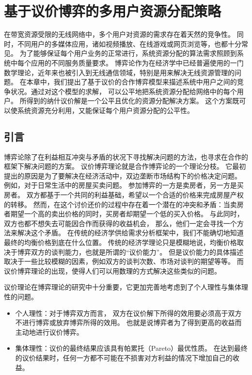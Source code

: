 \graphicspath{ {../body/nash_bargaining_figures/} }
\chapter{基于议价博弈的多用户资源分配策略}
在带宽资源受限的无线网络中，多个用户对资源的需求存在着天然的竞争性。
同时，不同用户的多媒体应用，诸如视频播放、在线游戏或网页浏览等，也都十分常见。
为了能够保证每个用户业务的正常进行，系统资源分配的算法需求照顾到系统中每个应用的不同服务质量要求。
博弈论作为在经济学中已经普遍使用的一门数学理论，近年来也被引入到无线通信领域，特别是用来解决无线资源管理的问题。
在本章中，我们提出了基于议价的合作博弈模型来描述系统中用户之间的竞争状况。通过对这个模型的求解，
可以公平地把系统资源分配给网络中的每个用户。
所得到的纳什议价解是一个公平且优化的资源分配解决方案。
这个方案既可以使系统资源充分利用，又能保证每个用户资源分配的公平性。

\section{引言}
博弈论除了在利益相互冲突与矛盾的状况下寻找解决问题的方法，也寻求在合作的框架下解决问题的方案。
议价博弈理论就是合作博弈论的一个理论分枝。
它最初提出的原因是为了要解决在经济活动中，双边垄断市场结构下的价格决定问题。
例如，对于日常生活中的房屋买卖问题。
参加博弈的一方是卖房者，另一方是买房者。
双方都基于一个共同的利益基础，希望以一个合适的价格来完成房屋产权的转移。
然而，在这个讨价还价的过程中存在着一个潜在的冲突和矛盾：当卖房者期望一个高的卖出价格的同时，买房者却期望一个低的买入价格。
与此同时，双方也都不想失去可能因合作而获得的收益机会，
那么，他们一定会寻找一个方法来解决这个矛盾。
在传统的经济学供给需求分析框架中，我们不能确切地知道最终的均衡价格到底在什么位置。
传统的经济学理论只是模糊地说，均衡价格取决于博弈双方的谈判能力，也就是所谓的“议价能力”。
但是议价能力的具体描述取决于一些比较模糊的因素，例如双方的谈判次数、市场对谈判的期望等等。
而议价博弈理论的出现，使得人们可以用数理的方式解决这些类似的问题。

议价理论在博弈理论的研究中十分重要，它更加完善地考虑到了个人理性与集体理性的问题。

\begin{itemize}
\item 个人理性：对于博弈双方而言，
双方在议价解下所得的效用要必须高于双方不进行博弈或放弃博弈所得的效用。
也就是说博弈者为了得到更高的收益而主动地进行议价博弈。
\item 集体理性：议价的最终结果应该具有帕累托（Pareto）最优性质。
在达到最终的议价结果时，任何一方都不可能在不损害对方利益的情况下增加自己的收益。
\end{itemize}

